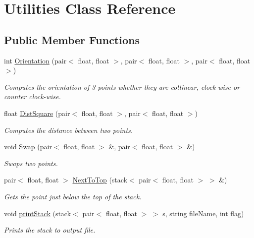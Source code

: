 \hypertarget{classUtilities}{}\section{Utilities Class Reference}
\label{classUtilities}
\subsection*{Public Member Functions}
\begin{DoxyCompactItemize}
\item 
int \hyperlink{classUtilities_aa161b52214dcb519ff8332d0c6b2d775}{Orientation} (pair$<$ float, float $>$, pair$<$ float, float $>$, pair$<$ float, float $>$)
\begin{DoxyCompactList}\small\item\em Computes the orientation of 3 points whether they are collinear, clock-\/wise or counter clock-\/wise. \end{DoxyCompactList}\item 
float \hyperlink{classUtilities_a5cc883930447bfc39d81ea4daa5a7027}{Dist\+Square} (pair$<$ float, float $>$, pair$<$ float, float $>$)
\begin{DoxyCompactList}\small\item\em Computes the distance between two points. \end{DoxyCompactList}\item 
void \hyperlink{classUtilities_af484ed1328548e360a206e0c2fd8f6a2}{Swap} (pair$<$ float, float $>$ \&, pair$<$ float, float $>$ \&)
\begin{DoxyCompactList}\small\item\em Swaps two points. \end{DoxyCompactList}\item 
pair$<$ float, float $>$ \hyperlink{classUtilities_a7a615679924f608ac116edfe146f8c1c}{Next\+To\+Top} (stack$<$ pair$<$ float, float $>$ $>$ \&)
\begin{DoxyCompactList}\small\item\em Gets the point just below the top of the stack. \end{DoxyCompactList}\item 
void \hyperlink{classUtilities_adbc03bfa1bfafa2bb8da8c0b277b7251}{print\+Stack} (stack$<$ pair$<$ float, float $>$ $>$ s, string file\+Name, int flag)
\begin{DoxyCompactList}\small\item\em Prints the stack to output file. \end{DoxyCompactList}\item 

\end{DoxyCompactItemize}
